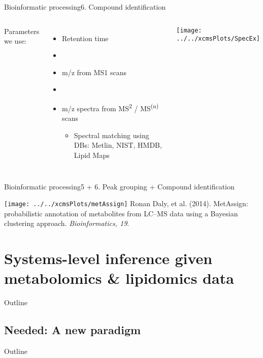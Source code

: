 \documentclass[xcolor=dvipsnames]{beamer}
\begin{document}
\begin{frame}{Bioinformatic processing}{6. Compound identification}
\vspace{-11pt}
\begin{columns}
	Parameters we use:
		\begin{itemize}
			\item Retention time \pause
			\item[]
			\item m/z from MS1 scans \pause
			\item[]
			\item m/z spectra from MS\textsuperscript{2} / MS\textsuperscript{(n)} scans \pause
			\begin{itemize}
				\item Spectral matching using DBs: Metlin, NIST, HMDB, Lipid Maps
			\end{itemize}
		\end{itemize}
	\begin{center}
			\texttt{[image: ../../xcmsPlots/SpecEx]}
	\end{center}
\end{columns}
\end{frame}

\begin{frame}{Bioinformatic processing}{5 + 6. Peak grouping + Compound identification}
\vspace{-10pt}
\begin{center}
	\texttt{[image: ../../xcmsPlots/metAssign]}
	\vspace{5mm}
	\tiny{Ronan Daly, et al. (2014). MetAssign: probabilistic annotation of metabolites from LC–MS data using a Bayesian clustering approach. \emph{Bioinformatics, 19}.}
\end{center}
\end{frame}

\section{Systems-level inference given metabolomics \& lipidomics data}

\begin{frame}{Outline}
\vspace{-10.5pt}
\tableofcontents[currentsection]
\end{frame}

\subsection{Needed: A new paradigm}
\begin{frame}{Outline}
\vspace{-10.5pt}
\end{frame}
\end{document}
